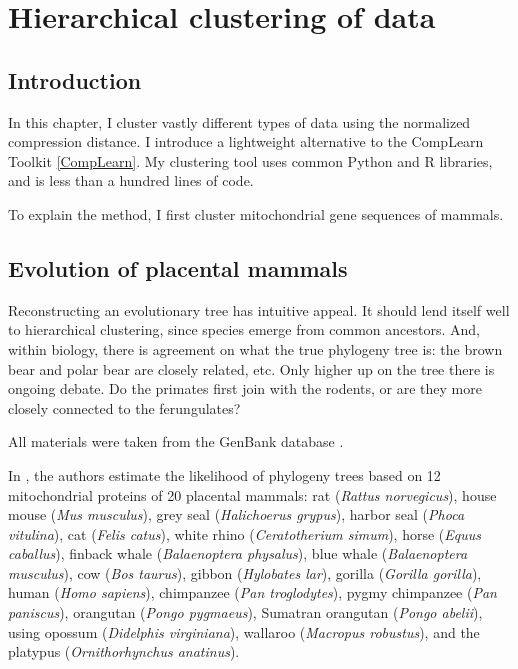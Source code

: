 
\chapter{Hierarchical clustering of data}

\label{Chapter3} %


\section{Introduction}

In this chapter, I cluster vastly different types of data using the
normalized compression distance. I introduce a lightweight alternative to
the CompLearn Toolkit \ref{CompLearn}. My clustering tool uses common
Python and R libraries, and is less than a hundred lines of code.

To explain the method, I first cluster mitochondrial gene sequences of
mammals.

\section{Evolution of placental mammals}

Reconstructing an evolutionary tree has intuitive appeal. It should lend
itself well to hierarchical clustering, since species emerge from common
ancestors. And, within biology, there is agreement on what the true
phylogeny tree is: the brown bear and polar bear are closely related, etc.
Only higher up on the tree there is ongoing debate. Do the primates first
join with the rodents, or are they more closely connected to the
ferungulates? 

All materials were taken from the GenBank database \cite{GenBank}.

In \cite{Cao1998}, the authors estimate the likelihood of phylogeny trees
based on 12 mitochondrial proteins of 20 placental mammals: rat
(\emph{Rattus norvegicus}), house mouse (\emph{Mus musculus}), grey seal
(\emph{Halichoerus grypus}), harbor seal (\emph{Phoca vitulina}), cat
(\emph{Felis catus}), white rhino (\emph{Ceratotherium simum}), horse
(\emph{Equus caballus}), finback whale (\emph{Balaenoptera physalus}),
blue whale (\emph{Balaenoptera musculus}), cow (\emph{Bos taurus}), gibbon
(\emph{Hylobates lar}), gorilla (\emph{Gorilla gorilla}), human
(\emph{Homo sapiens}), chimpanzee (\emph{Pan troglodytes}), pygmy
chimpanzee (\emph{Pan paniscus}), orangutan (\emph{Pongo pygmaeus}),
Sumatran orangutan (\emph{Pongo abelii}), using opossum (\emph{Didelphis
virginiana}), wallaroo (\emph{Macropus robustus}), and the platypus
(\emph{Ornithorhynchus anatinus}).

